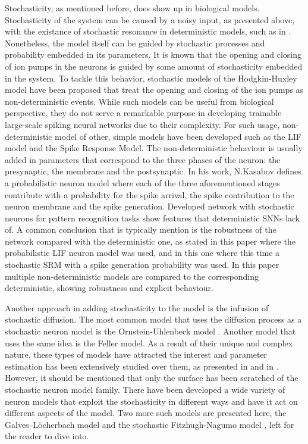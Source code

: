 \documentclass[12pt]{report}
\begin{document}
Stochasticity, as mentioned before, does show up in biological models. Stochasticity of the system can be caused by a noisy input, as presented above, with the existance of stochastic resonance in deterministic models, such as in \cite{Clayton2011}. Nonetheless, the model itself can be guided by stochastic processes and probability embedded in its parameters. It is known that the opening and closing of ion pumps in the neurons is guided by some amount of stochasticity embedded in the system. To tackle this behavior, stochastic models of the Hodgkin-Huxley model have been proposed \cite{Fox1997} that treat the opening and closing of the ion pumps as non-deterministic events. While such models can be useful from biological perspective, they do not serve a remarkable purpose in developing trainable large-scale spiking neural networks due to their complexity. For such usage, non-deterministic model of other, simple models have been developed such as the LIF model and the Spike Response Model. The non-deterministic behaviour is usually added in parameters that correspond to the three phases of the neuron: the presynaptic, the membrane and the postsynaptic. In his work\cite{Kasabov2010}, N.Kasabov defines a probabilistic neuron model where each of the three aforementioned stages contribute with a probability for the spike arrival, the spike contribution to the neuron membrane and the spike generation. Developed network with stochastic neurons for pattern recognition tasks show features that deterministic SNNs lack of. A common conclusion that is typically mention is the robustness of the network compared with the deterministic one, as stated in this paper\cite{Dhoble2011} where the probabilistic LIF neuron model was used, and in this one\cite{Sinyavskiy2010} where this time a stochastic SRM with a spike generation probability was used. In this paper \cite{Wu2012} multiple non-deterministic models are compared to the corresponding deterministic, showing robustness and explicit behaviour.

Another approach in adding stochasticity to the model is the infusion of stochastic diffusion. The most common model that uses the diffusion process as a stochastic neuron model is the Ornstein-Uhlenbeck model \cite{Lansky1995}. Another model that uses the same idea is the Feller model. As a result of their unique and complex nature, these types of models have attracted the interest and parameter estimation has been extensively studied over them, as presented in \cite{Ditlevsen2006} and in \cite{Lansky2008}. However, it should be mentioned that only the surface has been scratched of the stochastic neuron model family. There have been developed a wide variety of neuron models that exploit the stochasticity in different ways and have it act on different aspects of the model. Two more such models are presented here, the Galves–Löcherbach model \cite{Galves2013} and the stochastic Fitzhugh-Nagumo model \cite{Tuckwell1998}, left for the reader to dive into.
\end{document}
